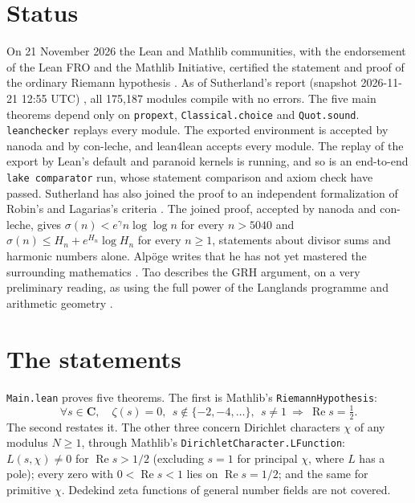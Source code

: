 \documentclass[11pt]{article}
\newcommand{\Lean}[1]{\texttt{\small #1}}
\renewcommand{\Re}{\operatorname{Re}}
\begin{document}
\section{Status}
On 21 November 2026 the Lean and Mathlib communities, with the endorsement of the Lean FRO and the Mathlib Initiative, certified the statement and proof of the ordinary Riemann hypothesis \cite{leanfro}. As of Sutherland's report (snapshot 2026-11-21 12:55 UTC) \cite{sutherland}, all 175{,}187 modules compile with no errors. The five main theorems depend only on \Lean{propext}, \Lean{Classical.choice} and \Lean{Quot.sound}. \Lean{leanchecker} replays every module. The exported environment is accepted by nanoda and by con-leche, and lean4lean accepts every module. The replay of the export by Lean's default and paranoid kernels is running, and so is an end-to-end \Lean{lake comparator} run, whose statement comparison and axiom check have passed. Sutherland has also joined the proof to an independent formalization of Robin's and Lagarias's criteria \cite{robin1984}. The joined proof, accepted by nanoda and con-leche, gives $\sigma(n) < e^{\gamma} n \log\log n$ for every $n > 5040$ and $\sigma(n) \le H_n + e^{H_n}\log H_n$ for every $n \ge 1$, statements about divisor sums and harmonic numbers alone. Alp\"oge writes that he has not yet mastered the surrounding mathematics \cite{alpoge}. Tao describes the GRH argument, on a very preliminary reading, as using the full power of the Langlands programme and arithmetic geometry \cite{tao}.

\section{The statements}
\Lean{Main.lean} proves five theorems. The first is Mathlib's \Lean{RiemannHypothesis}:
\[
\forall s\in\mathbf C,\quad \zeta(s)=0,\ \ s\notin\{-2,-4,\dots\},\ \ s\neq 1\ \Longrightarrow\ \Re s=\tfrac12 .
\]
The second restates it. The other three concern Dirichlet characters $\chi$ of any modulus $N\ge1$, through Mathlib's \Lean{DirichletCharacter.LFunction}: $L(s,\chi)\ne0$ for $\Re s>1/2$ (excluding $s=1$ for principal $\chi$, where $L$ has a pole); every zero with $0<\Re s<1$ lies on $\Re s=1/2$; and the same for primitive $\chi$. Dedekind zeta functions of general number fields are not covered.
\end{document}

